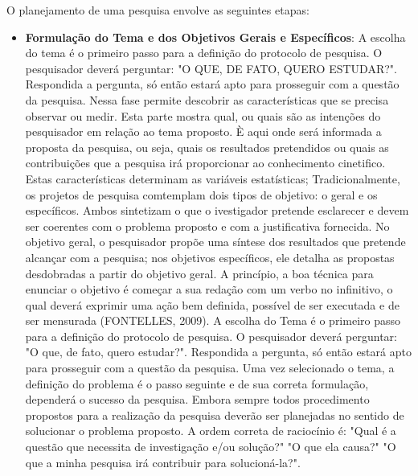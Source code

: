 O planejamento de uma pesquisa envolve as seguintes etapas:


 \begin{itemize}
\item \textbf{Formulação do Tema e dos Objetivos Gerais e Específicos}: 
A escolha do tema é o primeiro passo para a definição do protocolo de pesquisa. O pesquisador deverá perguntar: "O QUE, DE FATO, QUERO ESTUDAR?". Respondida a pergunta, só então estará apto para prosseguir com a questão da pesquisa. Nessa fase permite
descobrir as características que se precisa observar ou medir.
Esta parte mostra qual, ou quais são as intenções do pesquisador
em relação ao tema proposto. È aqui onde será informada a proposta
da pesquisa, ou seja, quais os resultados pretendidos ou quais as
contribuições que a pesquisa irá proporcionar ao conhecimento
cinetifico. Estas características determinam as variáveis
estatísticas; Tradicionalmente, os projetos de pesquisa comtemplam
dois tipos de objetivo: o geral e os específicos. Ambos sintetizam
o que o ivestigador pretende esclarecer e devem ser coerentes com
o problema proposto e com a justificativa fornecida. No objetivo
geral, o pesquisador propõe uma síntese dos resultados que
pretende alcançar com a pesquisa; nos objetivos específicos, ele
detalha as propostas desdobradas a partir do objetivo geral. A
princípio, a boa técnica para enunciar o objetivo é começar a sua
redação com um verbo no infinitivo, o qual deverá exprimir uma
ação bem definida, possível de ser executada e de ser mensurada
(FONTELLES, 2009). A escolha do Tema é o primeiro passo para a definição do protocolo de pesquisa. O pesquisador deverá perguntar: "O que, de fato, quero estudar?". Respondida a pergunta, só então estará apto para prosseguir com a questão da pesquisa. Uma vez selecionado o tema, a definição do problema é o passo seguinte e de sua correta formulação, dependerá o sucesso da pesquisa. Embora sempre todos procedimento propostos para a realização da pesquisa deverão ser planejadas no sentido de solucionar o problema proposto. A ordem correta de raciocínio é: "Qual é a questão que necessita de investigação e/ou solução?" 
"O que ela causa?" "O que a minha pesquisa irá contribuir para solucioná-la?".     




\end{itemize}
